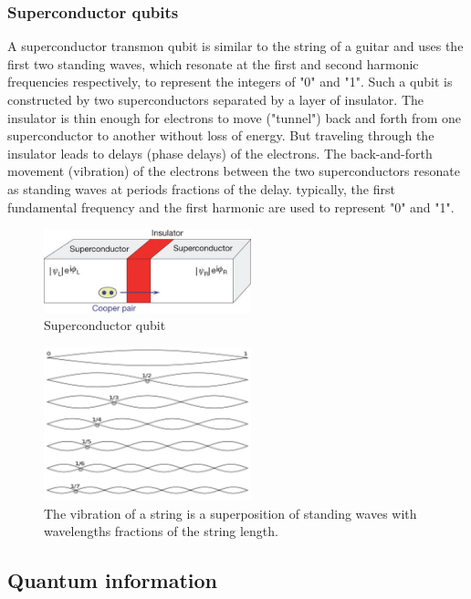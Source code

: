 \documentclass{book}
\begin{document}
\subsubsection{Superconductor qubits}
A superconductor transmon qubit is similar to the string of a guitar and uses the first two standing waves, which resonate at the first and second harmonic frequencies respectively, to represent the integers of "0" and "1". Such a qubit is constructed by two superconductors separated by a layer of insulator. The insulator is thin enough for electrons to move ("tunnel") back and forth from one superconductor to another without loss of energy. But traveling through the insulator leads to delays (phase delays) of the electrons. The back-and-forth movement (vibration) of the electrons between the two superconductors resonate as standing waves at periods fractions of the delay. typically, the first fundamental frequency and the first harmonic are used to represent "0" and "1".
\begin{figure}[ht]
\includegraphics[width=6cm]{pic/supercQubit.jpg}
\caption{Superconductor qubit}
\label{Superconductor}
\end{figure}

\begin{figure}[ht]
\includegraphics[width=6cm]{pic/overtones.png}
\caption{The vibration of a string is a superposition of standing waves with wavelengths fractions of the string length.}
\label{Overtones}
\end{figure}

\subsection{Quantum information}
\end{document}

